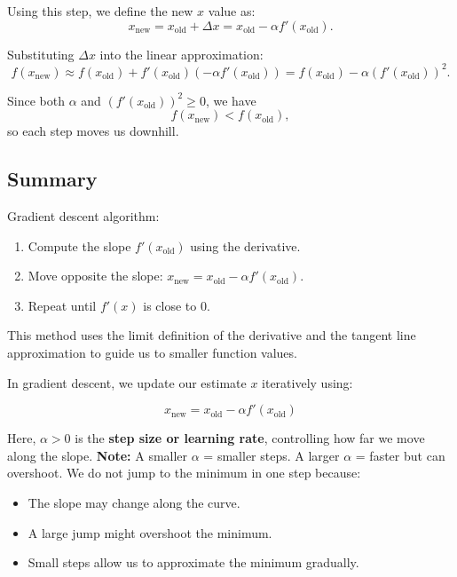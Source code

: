 \documentclass[11pt]{article}
\begin{document}
Using this step, we define the new $x$ value as:
\[
x_{\text{new}} = x_{\text{old}} + \Delta x = x_{\text{old}} - \alpha f'(x_{\text{old}}).
\]

Substituting $\Delta x$ into the linear approximation:
\[
f(x_{\text{new}}) \approx f(x_{\text{old}}) + f'(x_{\text{old}})(-\alpha f'(x_{\text{old}})) = f(x_{\text{old}}) - \alpha (f'(x_{\text{old}}))^2.
\]

Since both $\alpha$ and $(f'(x_{\text{old}}))^2 \ge 0$, we have
\[
f(x_{\text{new}}) < f(x_{\text{old}}),
\]
so each step moves us downhill.


\subsection*{Summary}

Gradient descent algorithm:

\begin{enumerate}
    \item Compute the slope $f'(x_{\text{old}})$ using the derivative.
    \item Move opposite the slope: $x_{\text{new}} = x_{\text{old}} - \alpha f'(x_{\text{old}})$.
    \item Repeat until $f'(x)$ is close to $0$.
\end{enumerate}

This method uses the limit definition of the derivative and the tangent line approximation to guide us to smaller function values.

In gradient descent, we update our estimate $x$ iteratively using:

\[
x_{\text{new}} = x_{\text{old}} - \alpha f'(x_{\text{old}})
\]

Here, $\alpha > 0$ is the \textbf{step size or learning rate}, controlling how far we move along the slope.
\textbf{Note:} A smaller $\alpha$ = smaller steps. A larger $\alpha$ = faster but can overshoot.
We do not jump to the minimum in one step because:
\begin{itemize}
    \item The slope may change along the curve.
    \item A large jump might overshoot the minimum.
    \item Small steps allow us to approximate the minimum gradually.
\end{itemize}
\end{document}
